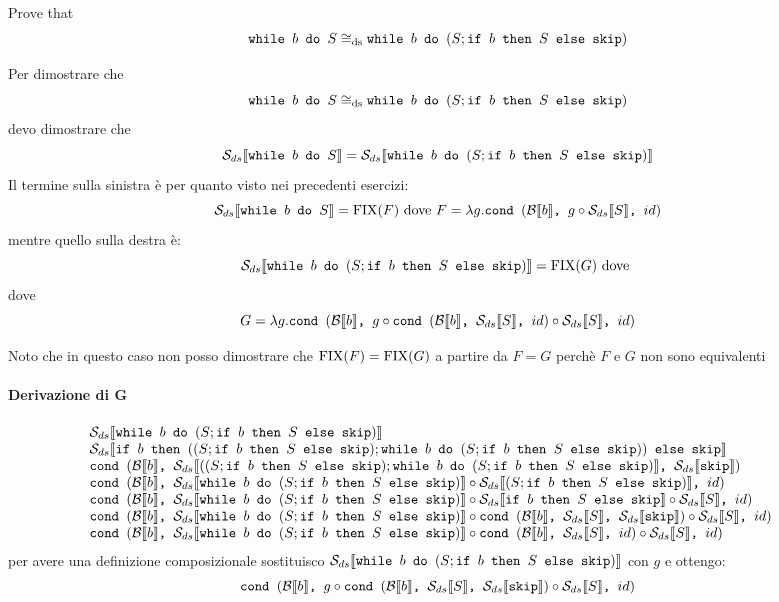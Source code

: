 {Prove that
$$
	\wbS{b}{S} \eqDS \wbS{b}{(S; \ifABC{b}{S}{\skipForFriends})}
$$
}
{
Per dimostrare che 
$$
	\wbS{b}{S} \eqDS \wbS{b}{(S; \ifABC{b}{S}{\skipForFriends})}
$$	
devo dimostrare che
$$
\dsCtxt{\wbS{b}{S}} = \dsCtxt{\wbS{b}{(S; \ifABC{b}{S}{\skipForFriends})}}
$$
Il termine sulla sinistra è per quanto visto nei precedenti esercizi:
$$
\dsCtxt{\wbS{b}{S}} = \fixp{F} \text{ dove } F = \lambda g. \cond{b}{g \circ \dsCtxt{S}}{id}
$$
mentre quello sulla destra è:
$$
\dsCtxt{\wbS{b}{(S; \ifABC{b}{S}{\skipForFriends})}} = \fixp{G} \text{ dove } 
$$
dove 
$$
G = \lambda g. \cond{b}{g \circ \cond{b}{\dsCtxt{S}}{id} \circ \dsCtxt{S}}{id} 
$$

Noto che in questo caso non posso dimostrare che $\fixp{F} = \fixp{G}$ a partire da $F = G$ perchè
$F$ e $G$ non sono equivalenti

\paragraph{Derivazione di G}
$$
\begin{array}{ll}
\dsCtxt{\wbS{b}{(S; \ifABC{b}{S}{\skipForFriends})}} & \\
\dsCtxt{\ifABC{b}{((S;  \ifABC{b}{S}{\skipForFriends}); \wbS{b}{(S; \ifABC{b}{S}{\skipForFriends})} )}{\skipForFriends}} & \\
\cond{b}{\dsCtxt{((S;  \ifABC{b}{S}{\skipForFriends}); \wbS{b}{(S; \ifABC{b}{S}{\skipForFriends})}}}{\dsCtxt{\skipForFriends}} \\
\cond{b}{\dsCtxt{\wbS{b}{(S; \ifABC{b}{S}{\skipForFriends})}} \circ \dsCtxt{(S;  \ifABC{b}{S}{\skipForFriends})}}{id} & \\
\cond{b}{\dsCtxt{\wbS{b}{(S; \ifABC{b}{S}{\skipForFriends})}} \circ \dsCtxt{\ifABC{b}{S}{\skipForFriends}} \circ \dsCtxt{S} }{id} & \\
\cond{b}{\dsCtxt{\wbS{b}{(S; \ifABC{b}{S}{\skipForFriends})}} \circ \cond{b}{\dsCtxt{S}}{\dsCtxt{\skipForFriends}} \circ \dsCtxt{S} }{id} & \\
\cond{b}{\dsCtxt{\wbS{b}{(S; \ifABC{b}{S}{\skipForFriends})}} \circ \cond{b}{\dsCtxt{S}}{id} \circ \dsCtxt{S} }{id} & \\
\end{array}
$$
per avere una definizione composizionale sostituisco $\dsCtxt{\wbS{b}{(S; \ifABC{b}{S}{\skipForFriends})}} $ con $g$ e ottengo:
$$
\cond{b}{g \circ \cond{b}{\dsCtxt{S}}{\dsCtxt{\skipForFriends}} \circ \dsCtxt{S} }{id}
$$
}